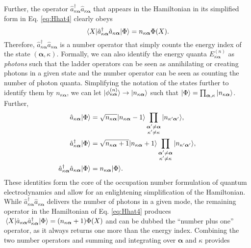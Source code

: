 \documentclass{article}
\numberwithin{equation}{section}
\begin{document}
Further, the operator $\hat{a}_{\kappa\bm{\alpha}}^\dagger\hat{a}_{\kappa\bm{\alpha}}$ that appears in the Hamiltonian in its simplified form in Eq. \eqref{eq:Hhat4} clearly obeys
\begin{equation}
\mel{X}{\hat{a}_{\kappa\bm{\alpha}}^\dagger\hat{a}_{\kappa\bm{\alpha}}}{\Phi} = n_{\kappa\bm{\alpha}}\Phi(X).
\end{equation}
Therefore, $\hat{a}_{\kappa\bm{\alpha}}^\dagger\hat{a}_{\kappa\bm{\alpha}}$ is a number operator that simply counts the energy index of the state $(\bm{\alpha},\kappa)$. Formally, we can also identify the energy quanta $E_{\kappa\bm{\alpha}}^{(n)}$ as \textit{photons} such that the ladder operators can be seen as annihilating or creating photons in a given state and the number operator can be seen as counting the number of photon quanta. Simplifying the notation of the states further to identify them by $n_{\kappa\bm{\alpha}}$, we can let $|{\phi_{\kappa\bm{\alpha}}^{(n)}}\rangle\to|{n_{\kappa\bm{\alpha}}}\rangle$ such that $|{\Phi}\rangle = \prod_{\bm{\alpha},\kappa}|{n_{\kappa\bm{\alpha}}}\rangle$. Further,
\begin{equation}\label{eq:raiseLowerOp}
\begin{split}
\hat{a}_{\kappa\bm{\alpha}}|{\Phi}\rangle &= \sqrt{n_{\kappa\bm{\alpha}}}|{n_{\kappa\bm{\alpha}} - 1}\rangle\prod_{\substack{\bm{\alpha}'\neq\bm{\alpha}\\\kappa'\neq\kappa}}|{n_{\kappa'\bm{\alpha}'}}\rangle,\\
\hat{a}_{\kappa\bm{\alpha}}^\dagger|{\Phi}\rangle &= \sqrt{n_{\kappa\bm{\alpha}} + 1}|{n_{\kappa\bm{\alpha}} + 1}\rangle\prod_{\substack{\bm{\alpha}'\neq\bm{\alpha}\\\kappa'\neq\kappa}}|{n_{\kappa'\bm{\alpha}'}}\rangle,\\
\hat{a}_{\kappa\bm{\alpha}}^\dagger\hat{a}_{\kappa\bm{\alpha}}|{\Phi}\rangle &= n_{\kappa\bm{\alpha}}|{\Phi}\rangle.
\end{split}
\end{equation}
These identities form the core of the occupation number formulation of quantum electrodynamics and allow for an enlightening simplification of the Hamiltonian. While $\hat{a}_{\kappa\bm{\alpha}}^\dagger\hat{a}_{\kappa\bm{\alpha}}$ delivers the number of photons in a given mode, the remaining operator in the Hamiltonian of Eq. \eqref{eq:Hhat4} produces $\mel{X}{\hat{a}_{\kappa\bm{\alpha}}\hat{a}^\dagger_{\kappa\bm{\alpha}}}{\Phi} = (n_{\kappa\bm{\alpha}} + 1)\Phi(X)$ and can be dubbed the ``number plus one'' operator, as it always returns one more than the energy index. Combining the two number operators and summing and integrating over $\bm{\alpha}$ and $\kappa$ provides
\end{document}
